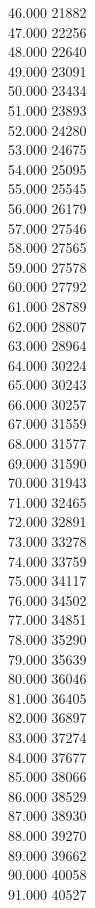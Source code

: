 { 46.000	21882 \\
 47.000	22256 \\
 48.000	22640 \\
 49.000	23091 \\
 50.000	23434 \\
 51.000	23893 \\
 52.000	24280 \\
 53.000	24675 \\
 54.000	25095 \\
 55.000	25545 \\
 56.000	26179 \\
 57.000	27546 \\
 58.000	27565 \\
 59.000	27578 \\
 60.000	27792 \\
 61.000	28789 \\
 62.000	28807 \\
 63.000	28964 \\
 64.000	30224 \\
 65.000	30243 \\
 66.000	30257 \\
 67.000	31559 \\
 68.000	31577 \\
 69.000	31590 \\
 70.000	31943 \\
 71.000	32465 \\
 72.000	32891 \\
 73.000	33278 \\
 74.000	33759 \\
 75.000	34117 \\
 76.000	34502 \\
 77.000	34851 \\
 78.000	35290 \\
 79.000	35639 \\
 80.000	36046 \\
 81.000	36405 \\
 82.000	36897 \\
 83.000	37274 \\
 84.000	37677 \\
 85.000	38066 \\
 86.000	38529 \\
 87.000	38930 \\
 88.000	39270 \\
 89.000	39662 \\
 90.000	40058 \\
 91.000	40527 \\
}
